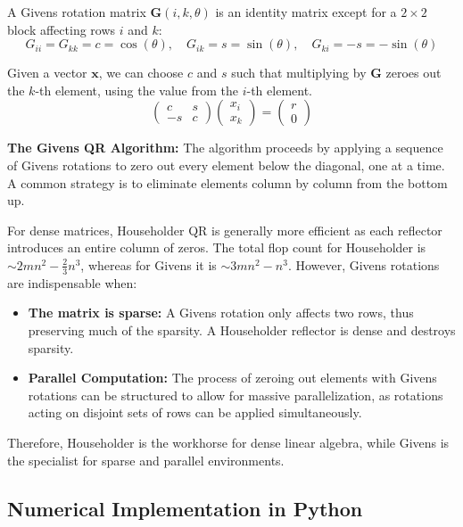 \begin{proposition}
\begin{definition}
A Givens rotation matrix $\mathbf{G}(i, k, \theta)$ is an identity matrix except for a $2 \times 2$ block affecting rows $i$ and $k$:
\[ G_{ii} = G_{kk} = c = \cos(\theta), \quad G_{ik} = s = \sin(\theta), \quad G_{ki} = -s = -\sin(\theta) \]
\end{definition}

Given a vector $\mathbf{x}$, we can choose $c$ and $s$ such that multiplying by $\mathbf{G}$ zeroes out the $k$-th element, using the value from the $i$-th element.
\[ \begin{pmatrix} c & s \\ -s & c \end{pmatrix} \begin{pmatrix} x_i \\ x_k \end{pmatrix} = \begin{pmatrix} r \\ 0 \end{pmatrix} \]

\textbf{The Givens QR Algorithm:} The algorithm proceeds by applying a sequence of Givens rotations to zero out every element below the diagonal, one at a time. A common strategy is to eliminate elements column by column from the bottom up.

\begin{remark}
For dense matrices, Householder QR is generally more efficient as each reflector introduces an entire column of zeros. The total flop count for Householder is $\sim 2mn^2 - \frac{2}{3}n^3$, whereas for Givens it is $\sim 3mn^2 - n^3$. However, Givens rotations are indispensable when:
\begin{itemize}
    \item \textbf{The matrix is sparse:} A Givens rotation only affects two rows, thus preserving much of the sparsity. A Householder reflector is dense and destroys sparsity.
    \item \textbf{Parallel Computation:} The process of zeroing out elements with Givens rotations can be structured to allow for massive parallelization, as rotations acting on disjoint sets of rows can be applied simultaneously.
\end{itemize}
Therefore, Householder is the workhorse for dense linear algebra, while Givens is the specialist for sparse and parallel environments.
\end{remark}

\newpage
\subsection{Numerical Implementation in Python}


\end{proposition}
